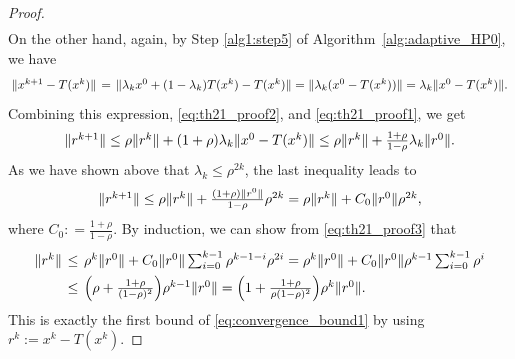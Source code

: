 \documentclass[10pt,a4paper]{amsart}
\newcommand{\norms}[1]{\Vert#1\Vert}
\begin{document}
\begin{proof}
\begin{equation}
\begin{array}{lcl}
\end{array}
\end{equation}
On the other hand, again, by Step \ref{alg1:step5} of Algorithm~\ref{alg:adaptive_HP0}, we have 
\begin{equation*} 
\arraycolsep=0.2em
\begin{array}{lcl}
\norms{x^{k+1} - T(x^k)} &= & \norms{ \lambda_kx^0 + (1-\lambda_k)T(x^k) - T(x^k)} = \norms{\lambda_k(x^0 - T(x^k))} = \lambda_k\norms{x^0 - T(x^k)}.
\end{array}
\end{equation*}
Combining this expression, \eqref{eq:th21_proof2}, and \eqref{eq:th21_proof1}, we get 
\begin{equation*} 
\arraycolsep=0.2em
\begin{array}{lcl}
\norms{r^{k+1}} \leq \rho\norms{r^k} + (1+\rho)\lambda_k\norms{x^0 - T(x^k)} \leq \rho\norms{r^k} + \frac{1+\rho}{1-\rho}\lambda_k\norms{r^0}.
\end{array}
\end{equation*}
As we have shown above that $\lambda_k \leq \rho^{2k}$, the last inequality leads to
\begin{equation}\label{eq:th21_proof3} 
\arraycolsep=0.2em
\begin{array}{lcl}
\norms{r^{k+1}} \leq \rho\norms{r^k} + \frac{(1+\rho)\norms{r^0}}{1-\rho}   \rho^{2k} = \rho \norms{r^k} + C_0\norms{r^0} \rho^{2k},
\end{array}
\end{equation}
where $C_0 : = \frac{1+\rho}{1-\rho}$.
By induction, we can show from \eqref{eq:th21_proof3} that
\begin{equation*} 
\arraycolsep=0.2em
\begin{array}{lcl}
\norms{r^k} & \leq & \rho^k\norms{r^0} + C_0\norms{r^0} \sum_{i=0}^{k-1}\rho^{k-1-i}\rho^{2i} = \rho^k\norms{r^0} + C_0\norms{r^0} \rho^{k-1}\sum_{i=0}^{k-1}\rho^i \vspace{1ex}\\
& \leq & \Big( \rho + \frac{1+\rho}{(1-\rho)^2}\Big)\rho^{k-1} \norms{r^0} = \Big(1 + \frac{1+\rho}{\rho(1-\rho)^2}\Big)\rho^{k} \norms{r^0}.
\end{array}
\end{equation*}
This is exactly the first bound of \eqref{eq:convergence_bound1} by using $r^k := x^k - T(x^k)$.


\end{proof}
\end{document}
